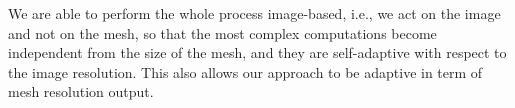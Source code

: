 We are able to perform the whole process image-based, i.e., we act on the image and not on the mesh, so that the most complex computations become independent from the size of the mesh, and they are self-adaptive with respect to the  image resolution. This also allows our approach to be adaptive in term of mesh resolution output.

% 
